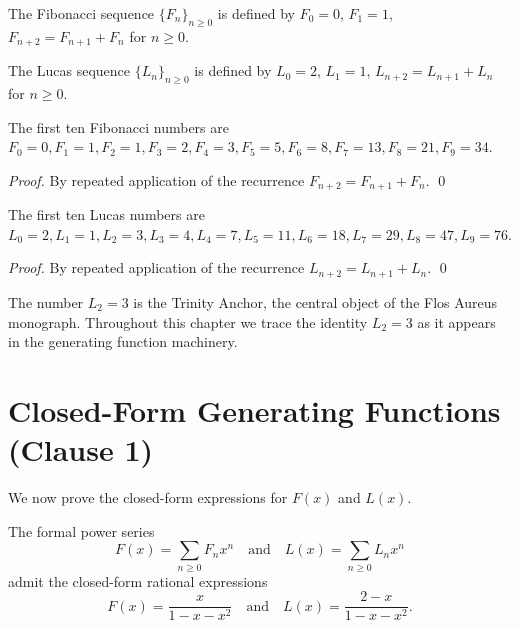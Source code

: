 \begin{definition}
\label{def:05-fib}
The Fibonacci sequence $\{F_n\}_{n \ge 0}$ is defined by
$F_0 = 0$, $F_1 = 1$, $F_{n+2} = F_{n+1} + F_n$ for $n \ge 0$.
\end{definition}

\begin{definition}
\label{def:05-luc}
The Lucas sequence $\{L_n\}_{n \ge 0}$ is defined by
$L_0 = 2$, $L_1 = 1$, $L_{n+2} = L_{n+1} + L_n$ for $n \ge 0$.
\end{definition}

\begin{lemma}
\label{lem:05-fib-vals}
The first ten Fibonacci numbers are
$F_0 = 0, F_1 = 1, F_2 = 1, F_3 = 2, F_4 = 3, F_5 = 5, F_6 = 8,
F_7 = 13, F_8 = 21, F_9 = 34$.
\end{lemma}

\begin{proof}
By repeated application of the recurrence $F_{n+2} = F_{n+1} + F_n$. \qed
\end{proof}

\begin{lemma}
\label{lem:05-luc-vals}
The first ten Lucas numbers are
$L_0 = 2, L_1 = 1, L_2 = 3, L_3 = 4, L_4 = 7, L_5 = 11, L_6 = 18,
L_7 = 29, L_8 = 47, L_9 = 76$.
\end{lemma}

\begin{proof}
By repeated application of the recurrence $L_{n+2} = L_{n+1} + L_n$. \qed
\end{proof}

\begin{remark}
The number $L_2 = 3$ is the Trinity Anchor, the central object of the
Flos Aureus monograph. Throughout this chapter we trace the identity
$L_2 = 3$ as it appears in the generating function machinery.
\end{remark}

\section{Closed-Form Generating Functions (Clause 1)}
\label{sec:05-closed-form}

We now prove the closed-form expressions for $F(x)$ and $L(x)$.

\begin{theorem}
\label{thm:05-genfn-closed}
The formal power series
\[
  F(x) = \sum_{n \ge 0} F_n x^n
  \quad\text{and}\quad
  L(x) = \sum_{n \ge 0} L_n x^n
\]
admit the closed-form rational expressions
\[
  F(x) = \frac{x}{1 - x - x^2}
  \quad\text{and}\quad
  L(x) = \frac{2 - x}{1 - x - x^2}.
\]
\end{theorem}

